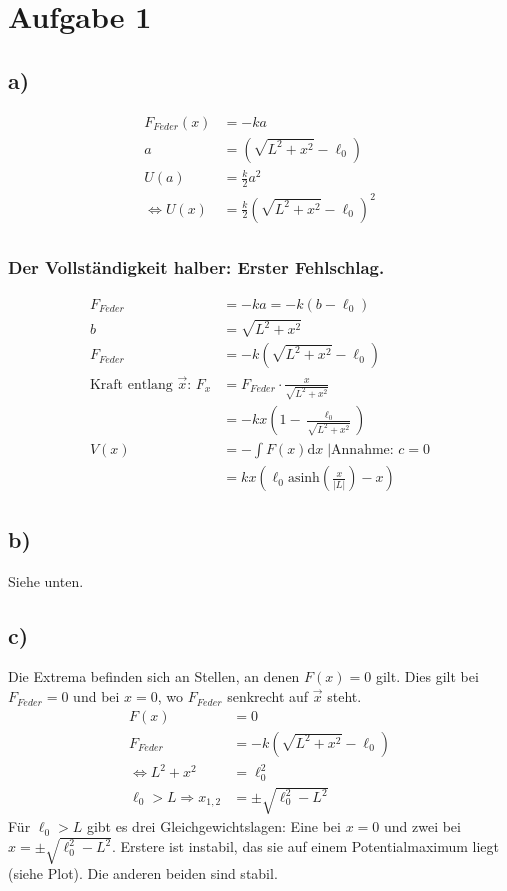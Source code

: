 \documentclass[12pt,a4paper,notitlepage]{article}
\title{}
\newcommand{\diff}{\mathrm{d}}
\newcommand{\aufgabe}[1]{\section*{\setcounter{section}{#1}Aufgabe #1}}
\begin{document}
\aufgabe{1}
\subsection*{a)}
\begin{align}
F_{Feder}(x)&=-ka\\
a&=\left(\sqrt{L^2+x^2}-\ell_0\right)\\
U(a)&=\frac{k}{2}a^2\\
\Leftrightarrow U(x)&=\frac{k}{2}\left(\sqrt{L^2+x^2}-\ell_0\right)^2\\
\end{align}
\subsubsection{Der Vollständigkeit halber: Erster Fehlschlag.}
\begin{align}
F_{Feder}&=-ka=-k\left(b-\ell_0\right)\\
b&=\sqrt{L^2+x^2}\\
F_{Feder}&=-k\left(\sqrt{L^2+x^2}-\ell_0\right)\\
\text{Kraft entlang }\vec x\text{: }F_x&=F_{Feder}\cdot\frac{x}{\sqrt{L^2+x^2}}\\
&=-kx\left(1-\frac{\ell_0}{\sqrt{L^2+x^2}}\right)\\
V(x)&=-\int F(x)\diff x\;\Big|\text{Annahme: }c=0\\
&=kx\left(\ell_0\text{asinh}\left(\frac{x}{\left|L\right|}\right)-x\right)
\end{align}
\subsection*{b)}
Siehe unten.
\begin{figure}[h!t]\begin{center}\end{center}\end{figure}
\begin{figure}[h!t]\begin{center}\end{center}\end{figure}
\subsection*{c)}
Die Extrema befinden sich an Stellen, an denen $F(x)=0$ gilt. Dies gilt bei $F_{Feder}=0$ und bei $x=0$, wo $F_{Feder}$ senkrecht auf $\vec x$ steht.
\begin{align}
F(x)&=0\\
F_{Feder}&=-k\left(\sqrt{L^2+x^2}-\ell_0\right)\\
\Leftrightarrow L^2+x^2&=\ell_0^2\\
\ell_0>L\Rightarrow x_{1,2}&=\pm\sqrt{\ell_0^2-L^2}
\end{align}
Für $\ell_0>L$ gibt es drei Gleichgewichtslagen: Eine bei $x=0$ und zwei bei $x=\pm\sqrt{\ell_0^2-L^2}$. Erstere ist instabil, das sie auf einem Potentialmaximum liegt (siehe Plot). Die anderen beiden sind stabil.
\end{document}
